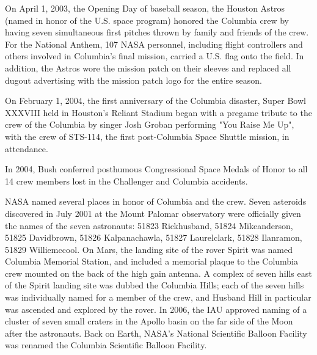 On April 1, 2003, the Opening Day of baseball season, the Houston Astros
(named in honor of the U.S. space program) honored the Columbia crew by
having seven simultaneous first pitches thrown by family and friends of
the crew. For the National Anthem, 107 NASA personnel, including flight
controllers and others involved in Columbia's final mission, carried a
U.S. flag onto the field. In addition, the Astros wore the mission patch
on their sleeves and replaced all dugout advertising with the mission
patch logo for the entire season.

On February 1, 2004, the first anniversary of the Columbia disaster,
Super Bowl XXXVIII held in Houston's Reliant Stadium began with a
pregame tribute to the crew of the Columbia by singer Josh Groban
performing "You Raise Me Up", with the crew of STS-114, the first
post-Columbia Space Shuttle mission, in attendance.

In 2004, Bush conferred posthumous Congressional Space Medals of Honor
to all 14 crew members lost in the Challenger and Columbia accidents.

NASA named several places in honor of Columbia and the crew. Seven
asteroids discovered in July 2001 at the Mount Palomar observatory were
officially given the names of the seven astronauts: 51823 Rickhusband,
51824 Mikeanderson, 51825 Davidbrown, 51826 Kalpanachawla, 51827
Laurelclark, 51828 Ilanramon, 51829 Williemccool. On Mars, the landing
site of the rover Spirit was named Columbia Memorial Station, and
included a memorial plaque to the Columbia crew mounted on the back of
the high gain antenna. A complex of seven hills east of the Spirit
landing site was dubbed the Columbia Hills; each of the seven hills was
individually named for a member of the crew, and Husband Hill in
particular was ascended and explored by the rover. In 2006, the IAU
approved naming of a cluster of seven small craters in the Apollo basin
on the far side of the Moon after the astronauts. Back on Earth, NASA's
National Scientific Balloon Facility was renamed the Columbia Scientific
Balloon Facility.

